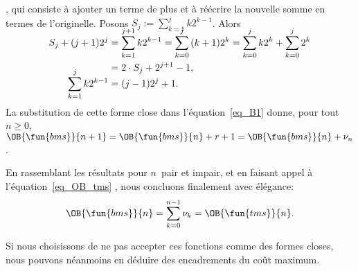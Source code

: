 \begin{itemize}
\citep[\S~2.3]{GrahamKnuthPatashnik_1994}, qui consiste à ajouter
un terme de plus et à réécrire la nouvelle somme en termes de
l'originelle. Posons \(S_{j} := \sum_{k=1}^{j}{k2^{k-1}}\). Alors
\begin{align}
\abovedisplayskip=2pt
\belowdisplayskip=0pt
S_{j} + (j+1)2^j &= \smash[t]{\sum_{k=1}^{j+1}{k2^{k-1}}} = \smash[t]{\sum_{k=0}^{j}{(k+1)2^{k}}}
= \smash[t]{\sum_{k=0}^{j}{k2^{k}}} + \smash[t]{\sum_{k=0}^{j}{2^{k}}}\notag\\
&= 2 \cdot S_{j} + 2^{j+1} - 1,\notag\\
\smash[t]{\sum_{k=1}^{j}{k2^{k-1}}} &= (j-1)2^j + 1.\label{eq_Sj}
\end{align}
La substitution de cette forme close dans l'équation~\eqref{eq_B1}
donne, pour tout \(n \geqslant 0\), \(\OB{\fun{bms}}{n+1} =
\OB{\fun{bms}}{n} + r + 1 = \OB{\fun{bms}}{n} + \nu_n\).
\end{itemize}
En rassemblant les résultats pour \(n\)~pair et impair, et en faisant
appel à l'équation~\eqref{eq_OB_tms} , nous
concluons finalement avec élégance:
\begin{equation}
\OB{\fun{bms}}{n} = \sum_{k=0}^{n-1}{\nu_k} = \OB{\fun{tms}}{n}.
\label{eq_OBbms}\index{bms@$\OB{\fun{bms}}{n}$}
\end{equation}








Si nous choisissons de ne pas accepter ces fonctions comme des formes
closes, nous pouvons néanmoins en déduire des encadrements du coût
maximum.

